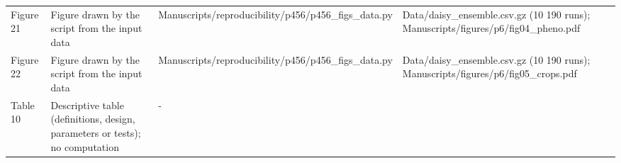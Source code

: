 {\begin{longtable}{p{}p{}p{}p{}}
{}Figure 21 & Figure drawn by the script from the input data & Manuscripts/\allowbreak{}reproducibility/\allowbreak{}p456/\allowbreak{}p456\_\allowbreak{}figs\_\allowbreak{}data.py & Data/\allowbreak{}daisy\_\allowbreak{}ensemble.csv.gz (10 190 runs);  Manuscripts/\allowbreak{}figures/\allowbreak{}p6/\allowbreak{}fig04\_\allowbreak{}pheno.pdf\\
{}Figure 22 & Figure drawn by the script from the input data & Manuscripts/\allowbreak{}reproducibility/\allowbreak{}p456/\allowbreak{}p456\_\allowbreak{}figs\_\allowbreak{}data.py & Data/\allowbreak{}daisy\_\allowbreak{}ensemble.csv.gz (10 190 runs);  Manuscripts/\allowbreak{}figures/\allowbreak{}p6/\allowbreak{}fig05\_\allowbreak{}crops.pdf\\
{}Table 10 & Descriptive table (definitions, design, parameters or tests); no computation & - & \\
\bottomrule\end{longtable}}
